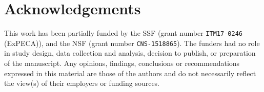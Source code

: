 \section*{Acknowledgements}\label{sec:acks}


This work has been partially funded by the \ac{SSF} (grant number \verb|ITM17-0246| (ExPECA)), and the \ac{NSF} (grant number \verb|CNS-1518865|).
The funders had no role in study design, data collection and analysis, decision to publish, or preparation of the manuscript.
Any opinions, findings, conclusions or recommendations expressed in this material are those of the authors and do not necessarily reflect the view(s) of their employers or funding sources.